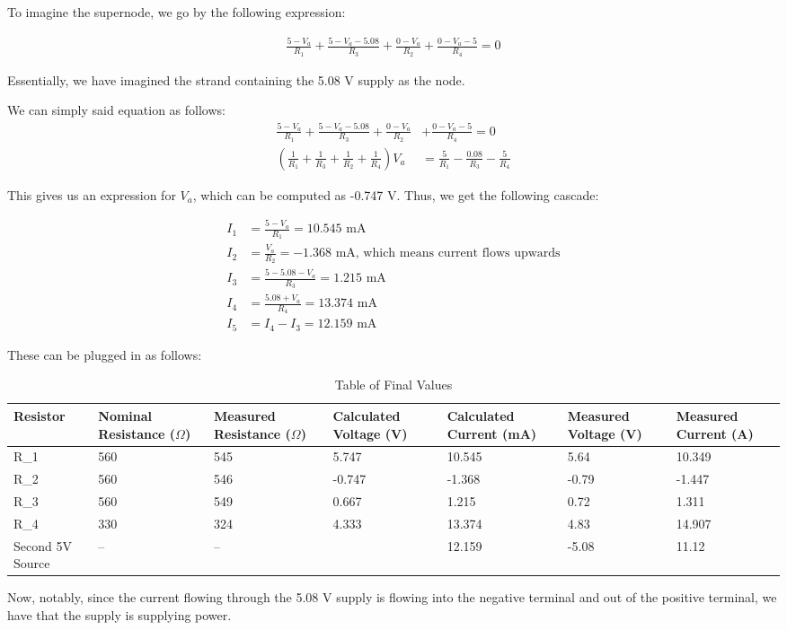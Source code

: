\documentclass{article}
\begin{document}
To imagine the supernode, we go by the following expression:

\begin{align}
    \frac{5-V_a}{R_1} + \frac{5-V_a-5.08}{R_3} + \frac{0-V_a}{R_2} + \frac{0-V_a-5}{R_4} = 0
\end{align}

Essentially, we have imagined the strand containing the 5.08 V supply as the node.

We can simply said equation as follows:
\begin{align*}
    \frac{5-V_a}{R_1} + \frac{5-V_a-5.08}{R_3} + \frac{0-V_a}{R_2} &+ \frac{0-V_a-5}{R_4} = 0 \\
    \left(\frac{1}{R_1} + \frac{1}{R_3} + \frac{1}{R_2} + \frac{1}{R_4} \right) V_a &= \frac{5}{R_1} - \frac{0.08}{R_3} - \frac{5}{R_4}
\end{align*}

This gives us an expression for $V_a$, which can be computed as -0.747 V. Thus, we get the following cascade:

\begin{align*}
    I_1 &= \frac{5-V_a}{R_1} = 10.545\text{ mA} \\
    I_2 &= \frac{V_a}{R_2} = -1.368\text{ mA, which means current flows upwards} \\
    I_3 &= \frac{5-5.08-V_a}{R_3} = 1.215\text{ mA} \\
    I_4 &= \frac{5.08+V_a}{R_4} = 13.374\text{ mA}  \\
    I_5 &= I_4 - I_3 = 12.159\text{ mA}
\end{align*}

These can be plugged in as follows:

\begin{table}[!h]
    \centering
    \begin{tabular}{|P{15mm}|P{15mm}|P{15mm}|P{15mm}|P{15mm}|P{15mm}|P{15mm}|}
        \hline Resistor & Nominal \newline Resistance ($\Omega$) & Measured \newline Resistance ($\Omega$) & Calculated Voltage (V) & Calculated \newline Current (mA) & Measured \newline Voltage (V) & Measured \newline Current (A) \\
        \hline R_1 & 560 & 545 & 5.747 & 10.545 & 5.64 & 10.349 \\
        \hline R_2 & 560 & 546 & -0.747 & -1.368 & -0.79 & -1.447 \\
        \hline R_3 & 560 & 549 & 0.667 & 1.215 & 0.72 & 1.311 \\
        \hline R_4 & 330 & 324 & 4.333 & 13.374 & 4.83 & 14.907 \\
        \hline Second 5V Source & -- & -- & & 12.159 & -5.08 & 11.12 \\
        \hline
    \end{tabular}
    \caption{Table of Final Values}
    \label{tab:final2}
\end{table}

Now, notably, since the current flowing through the 5.08 V supply is flowing into the negative terminal and out of the positive terminal, we have that the supply is supplying power.
\end{document}
